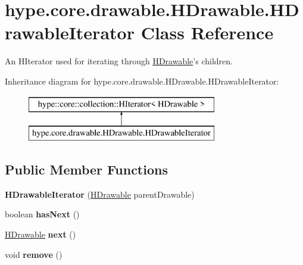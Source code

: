 \hypertarget{classhype_1_1core_1_1drawable_1_1_h_drawable_1_1_h_drawable_iterator}{\section{hype.\-core.\-drawable.\-H\-Drawable.\-H\-Drawable\-Iterator Class Reference}
\label{classhype_1_1core_1_1drawable_1_1_h_drawable_1_1_h_drawable_iterator}
}


An H\-Iterator used for iterating through \hyperlink{classhype_1_1core_1_1drawable_1_1_h_drawable}{H\-Drawable}'s children.  


Inheritance diagram for hype.\-core.\-drawable.\-H\-Drawable.\-H\-Drawable\-Iterator\-:\begin{figure}[H]
\begin{center}
\leavevmode
\includegraphics[height=2.000000cm]{classhype_1_1core_1_1drawable_1_1_h_drawable_1_1_h_drawable_iterator}
\end{center}
\end{figure}
\subsection*{Public Member Functions}
\begin{DoxyCompactItemize}
\item 
\hypertarget{classhype_1_1core_1_1drawable_1_1_h_drawable_1_1_h_drawable_iterator_aa5fe77b47bb3f311bde00267280cd6b7}{{\bfseries H\-Drawable\-Iterator} (\hyperlink{classhype_1_1core_1_1drawable_1_1_h_drawable}{H\-Drawable} parent\-Drawable)}\label{classhype_1_1core_1_1drawable_1_1_h_drawable_1_1_h_drawable_iterator_aa5fe77b47bb3f311bde00267280cd6b7}

\item 
\hypertarget{classhype_1_1core_1_1drawable_1_1_h_drawable_1_1_h_drawable_iterator_a9f7ce63fb0dc0babcdbdc89ebc71f6bd}{boolean {\bfseries has\-Next} ()}\label{classhype_1_1core_1_1drawable_1_1_h_drawable_1_1_h_drawable_iterator_a9f7ce63fb0dc0babcdbdc89ebc71f6bd}

\item 
\hypertarget{classhype_1_1core_1_1drawable_1_1_h_drawable_1_1_h_drawable_iterator_a2f1c304d0edf1b62ce953e5c333ec0bd}{\hyperlink{classhype_1_1core_1_1drawable_1_1_h_drawable}{H\-Drawable} {\bfseries next} ()}\label{classhype_1_1core_1_1drawable_1_1_h_drawable_1_1_h_drawable_iterator_a2f1c304d0edf1b62ce953e5c333ec0bd}

\item 
\hypertarget{classhype_1_1core_1_1drawable_1_1_h_drawable_1_1_h_drawable_iterator_adbccb3d059464cd3a835b62f2be72463}{void {\bfseries remove} ()}\label{classhype_1_1core_1_1drawable_1_1_h_drawable_1_1_h_drawable_iterator_adbccb3d059464cd3a835b62f2be72463}

\end{DoxyCompactItemize}


